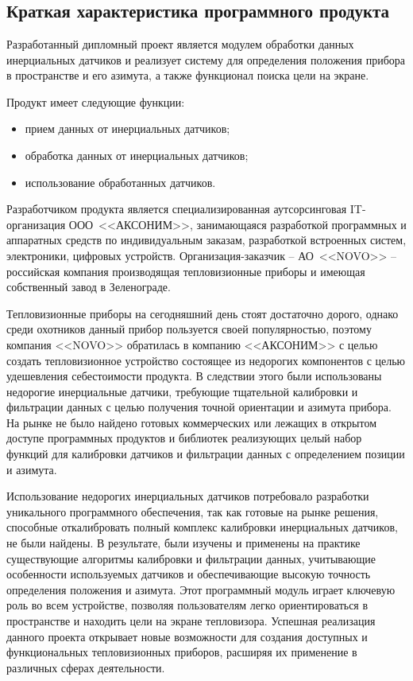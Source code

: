 \section{\texorpdfstring{\MakeUppercase \economicalPartName}{\economicalPartName}}


\subsection{Краткая характеристика программного продукта}

Разработанный дипломный проект является модулем обработки данных инерциальных датчиков
и реализует систему для определения положения прибора в пространстве и его азимута,
а также функционал поиска цели на экране.

Продукт имеет следующие функции:
\begin{itemize}
  \item прием данных от инерциальных датчиков;
  \item обработка данных от инерциальных датчиков;
  \item использование обработанных датчиков.
\end{itemize}

Разработчиком продукта является специализированная аутсорсинговая IT-организация
ООО~<<АКСОНИМ>>, занимающаяся разработкой программных и аппаратных средств
по индивидуальным заказам, разработкой встроенных систем, электроники,
цифровых устройств. Организация-заказчик -- АО~<<NOVO>> --
российская компания производящая тепловизионные приборы и имеющая собственный завод в Зеленограде.

Тепловизионные приборы на сегодняшний день стоят достаточно дорого, однако среди охотников данный прибор пользуется 
своей популярностью, поэтому компания <<NOVO>> обратилась в компанию <<АКСОНИМ>> с целью создать тепловизионное устройство
состоящее из недорогих компонентов с целью удешевления себестоимости продукта. В следствии этого были использованы недорогие
инерциальные датчики, требующие тщательной калибровки и фильтрации данных с целью получения точной ориентации и азимута прибора.
На рынке не было найдено готовых коммерческих или лежащих в открытом доступе программных продуктов и библиотек реализующих целый
набор функций для калибровки датчиков и фильтрации данных с определением позиции и азимута.

Использование недорогих инерциальных датчиков потребовало разработки уникального программного обеспечения, так как готовые
на рынке решения, способные откалибровать полный комплекс калибровки инерциальных датчиков, не были найдены. В результате, были изучены и применены на практике
существующие алгоритмы калибровки и фильтрации данных, учитывающие особенности используемых датчиков и обеспечивающие высокую 
точность определения положения и азимута. Этот программный модуль играет ключевую роль во всем устройстве, позволяя пользователям легко 
ориентироваться в пространстве и находить цели на экране тепловизора. Успешная реализация данного проекта открывает новые возможности для
создания доступных и функциональных тепловизионных приборов, расширяя их применение в различных сферах деятельности.

